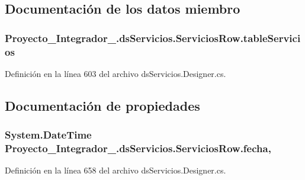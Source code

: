 \subsection{Documentación de los datos miembro}
\hypertarget{class_proyecto___integrador__3_1_1ds_servicios_1_1_servicios_row_a85bb3c370c1c6a424e314e851191631d}{
\subsubsection[{table\-Servicios}]{ Proyecto\-\_\-\-Integrador\-\_.\-ds\-Servicios.\-Servicios\-Row.\-table\-Servicios\hspace{0.3cm}{\ttfamily [private]}}}\label{class_proyecto___integrador__3_1_1ds_servicios_1_1_servicios_row_a85bb3c370c1c6a424e314e851191631d}


Definición en la línea 603 del archivo ds\-Servicios.\-Designer.\-cs.



\subsection{Documentación de propiedades}
\hypertarget{class_proyecto___integrador__3_1_1ds_servicios_1_1_servicios_row_a555547658fa71e0e540c35adc66bb450}{
\subsubsection[{fecha}]{\setlength{\rightskip}{0pt plus 5cm}System.\-Date\-Time Proyecto\-\_\-\-Integrador\-\_.\-ds\-Servicios.\-Servicios\-Row.\-fecha\hspace{0.3cm}{\ttfamily [get]}, {\ttfamily [set]}}}\label{class_proyecto___integrador__3_1_1ds_servicios_1_1_servicios_row_a555547658fa71e0e540c35adc66bb450}


Definición en la línea 658 del archivo ds\-Servicios.\-Designer.\-cs.

